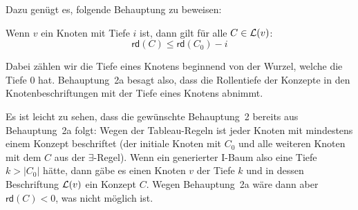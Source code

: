 \documentclass[fontsize=11pt, twoside=false, numbers=autoenddot]{scrbook}
\begin{document}
\par\noindent
\begin{beweis}
  Dazu genügt es, folgende Behauptung zu beweisen:
  
  \parII
  Wenn $v$ ein Knoten mit Tiefe $i$ ist,
  dann gilt für alle $C \in \mathcal{L}(v)$:
  \[
    \textsf{rd}(C) \leq \textsf{rd}(C_0) - i
    \tag{$(*)$}
  \]
  
  \parII
  Dabei zählen wir die Tiefe eines Knotens beginnend von der Wurzel,
  welche die Tiefe 0 hat. Behauptung~2a besagt also, dass die Rollentiefe
  der Konzepte in den Knotenbeschriftungen mit der Tiefe eines Knotens abnimmt.
  
  Es ist leicht zu sehen, dass die gewünschte Behauptung~2
  bereits aus Behauptung~2a folgt:
  Wegen der Tableau-Regeln ist jeder Knoten mit mindestens einem Konzept
  beschriftet (der initiale Knoten mit $C_0$ und alle weiteren Knoten mit dem
  $C$ aus der $\exists$-Regel).
  Wenn ein generierter I-Baum also eine Tiefe $k > |C_0|$ hätte,
  dann gäbe es einen Knoten $v$ der Tiefe $k$ und in dessen Beschriftung $\mathcal{L}(v)$
  ein Konzept $C$. Wegen Behauptung~2a wäre dann aber $\textsf{rd}(C) < 0$,
  was nicht möglich ist.
  

\end{beweis}
\end{document}

